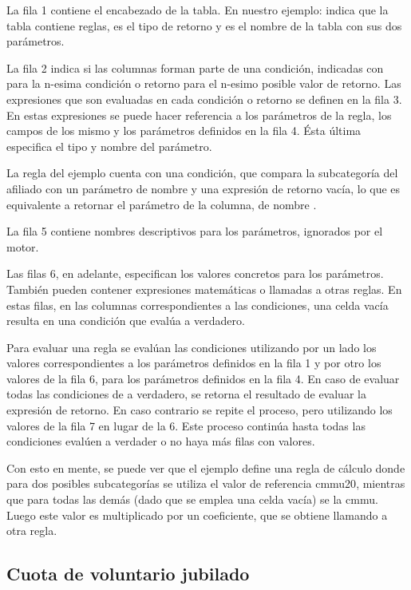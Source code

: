 La fila 1 contiene el encabezado de la tabla.
En nuestro ejemplo:  indica que la tabla contiene reglas,
 es el tipo de retorno y  es el nombre de la tabla con sus dos parámetros.

La fila 2 indica si las columnas forman parte de una condición, indicadas con  para la n-esima condición o retorno  para el n-esimo posible valor de retorno. Las expresiones que son evaluadas en cada condición o retorno se definen en la fila 3. En estas expresiones se puede hacer referencia a los parámetros de la regla, los campos de los mismo y los parámetros definidos en la fila 4. Ésta última especifica el tipo y nombre del parámetro.

La regla del ejemplo cuenta con una condición, que compara la subcategoría del afiliado con un parámetro de nombre  y una expresión de retorno vacía, lo que es equivalente a retornar el parámetro de la columna, de nombre .

La fila 5 contiene nombres descriptivos para los parámetros, ignorados por el motor.

Las filas 6, en adelante, especifican los valores concretos para los parámetros.
También pueden contener expresiones matemáticas o llamadas a otras reglas. En estas filas, en las columnas correspondientes a las condiciones, una celda vacía resulta en una condición que evalúa a verdadero.

Para evaluar una regla se evalúan las condiciones utilizando por un lado los valores correspondientes a los parámetros definidos en la fila 1 y por otro los valores de la fila 6, para los parámetros definidos en la fila 4. En caso de evaluar todas las condiciones de a verdadero, se retorna el resultado de evaluar la expresión de retorno. En caso contrario se repite el proceso, pero utilizando los valores de la fila 7 en lugar de la 6. Este proceso continúa hasta todas las condiciones evalúen a verdader o no haya más filas con valores.

Con esto en mente, se puede ver que el ejemplo define una regla de cálculo donde para dos posibles subcategorías se utiliza el valor de referencia \acrshort{cmmu20}, mientras que para todas las demás (dado que se emplea una celda vacía) se la \acrshort{cmmu}. Luego este valor es multiplicado por un coeficiente, que se obtiene llamando a otra regla.

\subsection{Cuota de voluntario jubilado}

